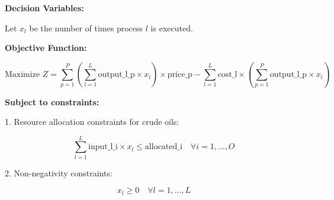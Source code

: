 \documentclass{article}
\begin{document}
\textbf{Decision Variables:}

Let \( x_l \) be the number of times process \( l \) is executed.

\textbf{Objective Function:}

\[
\text{Maximize } Z = \sum_{p=1}^{P} \left( \sum_{l=1}^{L} \text{output\_l\_p} \times x_l \right) \times \text{price\_p} - \sum_{l=1}^{L} \text{cost\_l} \times \left( \sum_{p=1}^{P} \text{output\_l\_p} \times x_l \right)
\]

\textbf{Subject to constraints:}

1. Resource allocation constraints for crude oils:

\[
\sum_{l=1}^{L} \text{input\_l\_i} \times x_l \leq \text{allocated\_i} \quad \forall i = 1, \ldots, O
\]

2. Non-negativity constraints:

\[
x_l \geq 0 \quad \forall l = 1, \ldots, L
\]
\end{document}
